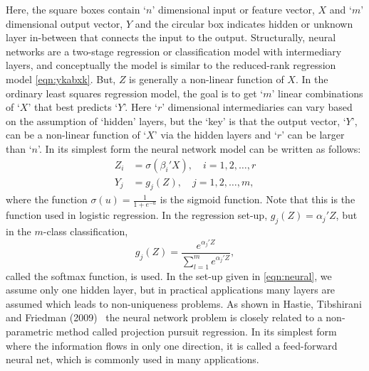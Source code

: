 Here, the square boxes contain `$n$' dimensional input or feature vector, $X$ and `$m$' dimensional output vector, $Y$ and the circular box indicates hidden or unknown layer in-between that connects the input to the output. Structurally, neural networks are a two-stage regression or classification model with intermediary layers, and conceptually the model is similar to the reduced-rank regression model \ref{eqn:ykabxk}. But, $Z$ is generally a non-linear function of $X$. In the ordinary least squares regression model, the goal is to get `$m$' linear combinations of `$X$' that best predicts `$Y$'. Here `$r$' dimensional intermediaries can vary based on the assumption of `hidden' layers, but the `key' is that the output vector, `$Y$', can be a non-linear function of `$X$' via the hidden layers and `$r$' can be larger than `$n$'. In its simplest form the neural network model can be written as follows:
	\begin{equation} \label{eqn:neurallabel}
	\begin{aligned}
	Z_i&= \sigma(\beta_i'X), \quad i=1,2,\ldots,r \\
	Y_j&= g_j(Z), \quad j=1,2,\ldots,m,
	\end{aligned}
	\end{equation}
where the function $\sigma(u)=\frac{1}{1+e^{-u}}$ is the sigmoid function. Note that this is the  function used in logistic regression. In the regression set-up, $g_j(Z)=\alpha_j' Z$, but in the $m$-class classification,
	\begin{equation} \label{eqn:gjzclass}
	g_j(Z)= \dfrac{e^{\alpha_j' Z}}{\displaystyle\sum_{l=1}^m e^{\alpha_j' Z}},
	\end{equation}
called the softmax function, is used. In the set-up given in \eqref{eqn:neural}, we assume only one hidden layer, but in practical applications many layers are assumed which leads to non-uniqueness problems. As shown in Hastie, Tibshirani and Friedman (2009)~\cite{hastibf} the neural network problem is closely related to a non-parametric method called projection pursuit regression. In its simplest form where the information flows in only one direction, it is called a feed-forward neural net, which is commonly used in many applications.


